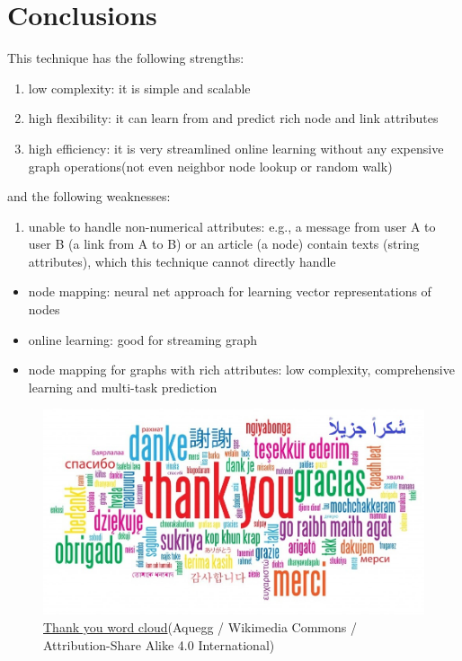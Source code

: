 \documentclass{article}
\begin{document}
\section{Conclusions}
This technique has the following strengths:
\begin{enumerate}
	\item low complexity: it is simple and scalable
	\item high flexibility: it can learn from and predict rich node and link attributes
	\item high efficiency: it is very streamlined online learning without any expensive graph operations(not even neighbor node lookup or random walk)
\end{enumerate}
and the following weaknesses:
\begin{enumerate}
	\item unable to handle non-numerical attributes: e.g., a message from user A to user B (a link from A to B) or an article (a node) contain texts (string attributes), which this technique cannot directly handle
\end{enumerate}
\begin{itemize}
	\item node mapping: neural net approach for learning vector 
	representations of nodes
	\item online learning: good for streaming graph
	\item node mapping for graphs with rich attributes: low complexity, 
	comprehensive learning and multi-task prediction
\end{itemize}
\begin{figure}[H]
	\centering
	\includegraphics[width=\linewidth]{Thank-you-word-cloud}
	\caption{ 
	\href{https://commons.wikimedia.org/wiki/File:Spectrogram-19thC.png}{Thank 
	you word cloud}(Aquegg / Wikimedia Commons / Attribution-Share Alike 4.0 
	International)}
	\label{fig:Thank-you-word-cloud}
\end{figure}



\end{document}
